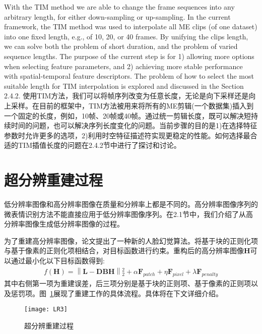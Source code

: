With the TIM method we are able to change the frame sequences into any arbitrary length, for either down-sampling or up-sampling. In the current framework, the TIM method was used to interpolate all ME clips (of one dataset) into one fixed length, e.g., of 10, 20, or 40 frames. By unifying the clips length, we can solve both the problem of short duration, and the problem of varied sequence lengths. The purpose of the current step is for 1) allowing more options when selecting feature parameters, and 2) achieving more stable performance with spatial-temporal feature descriptors. The problem of how to select the most suitable length for TIM interpolation is explored and discussed in the Section 2.4.2.
使用TIM方法，我们可以将帧序列改变为任意长度，无论是向下采样还是向上采样。在目前的框架中，TIM方法被用来将所有的ME剪辑(一个数据集)插入到一个固定的长度，例如，10帧、20帧或40帧。通过统一剪辑长度，既可以解决短持续时间的问题，也可以解决序列长度变化的问题。当前步骤的目的是1)在选择特征参数时允许更多的选项，2)利用时空特征描述符实现更稳定的性能。如何选择最合适的TIM插值长度的问题在2.4.2节中进行了探讨和讨论。

\section{超分辨重建过程}

低分辨率图像和高分辨率图像在质量和分辨率上都是不同的。高分辨率图像序列的微表情识别方法不能直接应用于低分辨率图像序列。在2.1节中，我们介绍了从高分辨率图像生成低分辨率图像的过程。

为了重建高分辨率图像，论文提出了一种新的人脸幻觉算法。将基于块的正则化项与基于像素的正则化项相结合，对目标函数进行约束。重构后的高分辨率图像$\boldsymbol{H}$可以通过最小化以下目标函数得到:
\begin{equation}
 \label{eq4}
 \begin{split}
    f\left ( \boldsymbol{H} \right )= \left \| \boldsymbol{L}-\boldsymbol{DBH} \right \|{_{2}^{2}}+\alpha \boldsymbol{F}_{patch}+\eta \boldsymbol{F}_{pixel}+\lambda \boldsymbol{F}_{penalty}
 \end{split}
\end{equation}
其中右侧第一项为重建误差，后三项分别是基于块的正则项、基于像素的正则项以及惩罚项。图~\ref{fig15}展现了重建工作的具体流程。具体将在下文详细介绍。

\begin{figure}[!htbp]
\centering
\texttt{[image: LR3]}
\caption{超分辨重建过程}
\label{fig15}
\end{figure}

